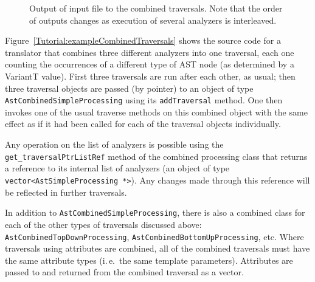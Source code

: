 \begin{figure}[!h]
{\indent
{\mySmallFontSize


\begin{latexonly}
   
\end{latexonly}

\begin{htmlonly}
   
\end{htmlonly}

}
}
\caption{Output of input file to the combined traversals. Note that the order
of outputs changes as execution of several analyzers is interleaved.}
\label{Tutorial:exampleOutput_CombinedTraversals}
\end{figure}

Figure~\ref{Tutorial:exampleCombinedTraversals} shows the source code for a
translator that combines three different analyzers into one traversal, each
one counting the occurrences of a different type of AST node (as determined by
a VariantT value). First three traversals are run after each other, as usual;
then three traversal objects are passed (by pointer) to an object of type {\tt
AstCombinedSimpleProcessing} using its {\tt addTraversal} method. One then
invokes one of the usual traverse methods on this combined object with the
same effect as if it had been called for each of the traversal objects
individually.

Any operation on the list of analyzers is possible using the {\tt
get\_traversalPtrListRef} method of the combined processing class that returns
a reference to its internal list of analyzers (an object of type {\tt
vector<AstSimpleProcessing *>}). Any changes made through this reference will
be reflected in further traversals.

In addition to {\tt AstCombinedSimpleProcessing}, there is also a combined
class for each of the other types of traversals discussed above: {\tt
AstCombinedTopDownProcessing}, {\tt AstCombinedBottomUpProcessing}, etc. Where
traversals using attributes are combined, all of the combined traversals must
have the same attribute types (i.\,e.~the same template parameters). Attributes
are passed to and returned from the combined traversal as a vector.

